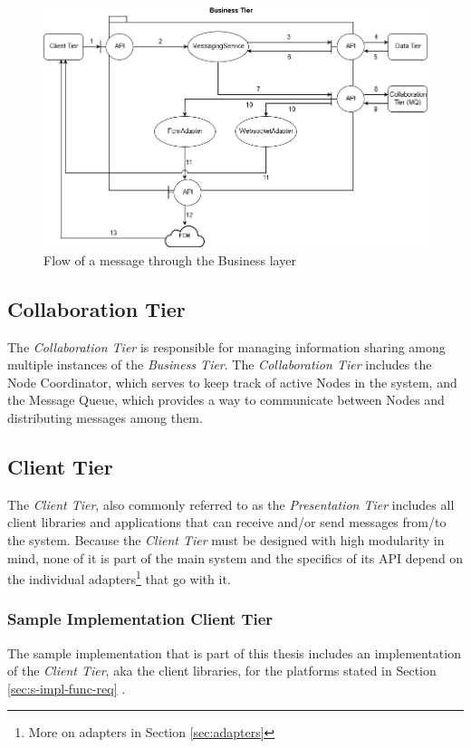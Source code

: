 \begin{figure}[H]
	\centering
	\includegraphics[width=1\textwidth]{figures/03_design/msg-flow}
    \caption{Flow of a message through the Business layer}
    \label{fig:msg-flow}
\end{figure}

\subsection{Collaboration Tier}
The \textit{Collaboration Tier} is responsible for managing information sharing among multiple instances of the \textit{Business Tier}. The \textit{Collaboration Tier} includes the Node Coordinator, which serves to keep track of active Nodes in the system, and the Message Queue, which provides a way to communicate between Nodes and distributing messages among them.

\subsection{Client Tier}
The \textit{Client Tier}, also commonly referred to as the \textit{Presentation Tier} includes all client libraries and applications that can receive and/or send messages from/to the system. Because the \textit{Client Tier} must be designed with high modularity in mind, none of it is part of the main system and the specifics of its API depend on the individual adapters\footnote{More on adapters in Section \ref{sec:adapters}} that go with it.

\subsubsection{Sample Implementation Client Tier}
The sample implementation that is part of this thesis includes an implementation of the \textit{Client Tier}, aka the client libraries, for the platforms stated in Section \ref{sec:s-impl-func-req} .
